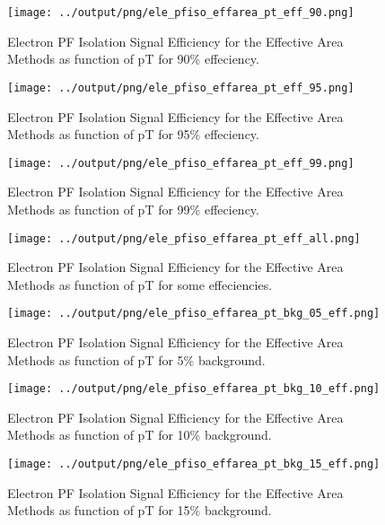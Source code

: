 \documentclass[11pt]{book}
\begin{document}
\begin{figure}[htb]
\centering
\texttt{[image: ../output/png/ele\_pfiso\_effarea\_pt\_eff\_90.png]}
\caption{Electron PF Isolation Signal Efficiency for the Effective Area Methods as function of pT for 90\% effeciency.}
\label{fig:ele_pfiso_pt_eff_effarea_eff_90}
\end{figure}

\begin{figure}[htb]
\centering
\texttt{[image: ../output/png/ele\_pfiso\_effarea\_pt\_eff\_95.png]}
\caption{Electron PF Isolation Signal Efficiency for the Effective Area Methods as function of pT for 95\% effeciency.}
\label{fig:ele_pfiso_pt_eff_effarea_eff_95}
\end{figure}

\begin{figure}[htb]
\centering
\texttt{[image: ../output/png/ele\_pfiso\_effarea\_pt\_eff\_99.png]}
\caption{Electron PF Isolation Signal Efficiency for the Effective Area Methods as function of pT for 99\% effeciency.}
\label{fig:ele_pfiso_pt_eff_effarea_eff_99}
\end{figure}

\begin{figure}[htb]
\centering
\texttt{[image: ../output/png/ele\_pfiso\_effarea\_pt\_eff\_all.png]}
\caption{Electron PF Isolation Signal Efficiency for the Effective Area Methods as function of pT for some effeciencies.}
\label{fig:ele_pfiso_pt_eff_effarea_eff_all}
\end{figure}

\begin{figure}[htb]
\centering
\texttt{[image: ../output/png/ele\_pfiso\_effarea\_pt\_bkg\_05\_eff.png]}
\caption{Electron PF Isolation Signal Efficiency for the Effective Area Methods as function of pT for 5\% background.}
\label{fig:ele_pfiso_pt_bkg_effarea_bkg_05_eff}
\end{figure}

\begin{figure}[htb]
\centering
\texttt{[image: ../output/png/ele\_pfiso\_effarea\_pt\_bkg\_10\_eff.png]}
\caption{Electron PF Isolation Signal Efficiency for the Effective Area Methods as function of pT for 10\% background.}
\label{fig:ele_pfiso_pt_bkg_effarea_bkg_10_eff}
\end{figure}

\begin{figure}[htb]
\centering
\texttt{[image: ../output/png/ele\_pfiso\_effarea\_pt\_bkg\_15\_eff.png]}
\caption{Electron PF Isolation Signal Efficiency for the Effective Area Methods as function of pT for 15\% background.}
\label{fig:ele_pfiso_pt_bkg_effarea_bkg_15_eff}
\end{figure}
\end{document}
